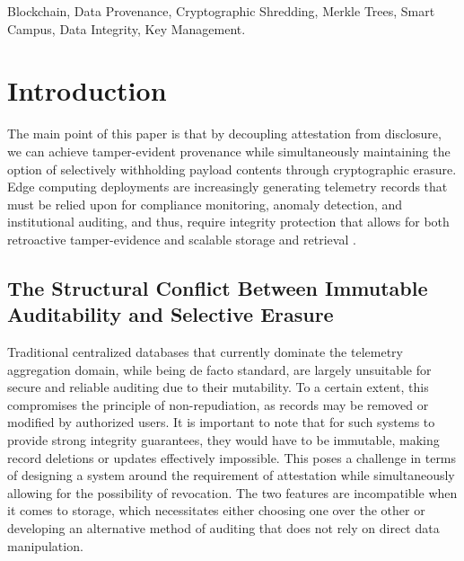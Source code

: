 \documentclass[conference]{IEEEtran}
\begin{document}
\begin{IEEEkeywords}
Blockchain, Data Provenance, Cryptographic Shredding, Merkle Trees, Smart Campus, Data Integrity, Key Management.
\end{IEEEkeywords}

\section{Introduction}

The main point of this paper is that by decoupling attestation from disclosure, we can achieve tamper-evident provenance while simultaneously maintaining the option of selectively withholding payload contents through cryptographic erasure. Edge computing deployments are increasingly generating telemetry records that must be relied upon for compliance monitoring, anomaly detection, and institutional auditing, and thus, require integrity protection that allows for both retroactive tamper-evidence and scalable storage and retrieval \cite{b21}.

\subsection{The Structural Conflict Between Immutable Auditability and Selective Erasure}
Traditional centralized databases that currently dominate the telemetry aggregation domain, while being de facto standard, are largely unsuitable for secure and reliable auditing due to their mutability. To a certain extent, this compromises the principle of non-repudiation, as records may be removed or modified by authorized users. It is important to note that for such systems to provide strong integrity guarantees, they would have to be immutable, making record deletions or updates effectively impossible. This poses a challenge in terms of designing a system around the requirement of attestation while simultaneously allowing for the possibility of revocation. The two features are incompatible when it comes to storage, which necessitates either choosing one over the other or developing an alternative method of auditing that does not rely on direct data manipulation.
\end{document}
